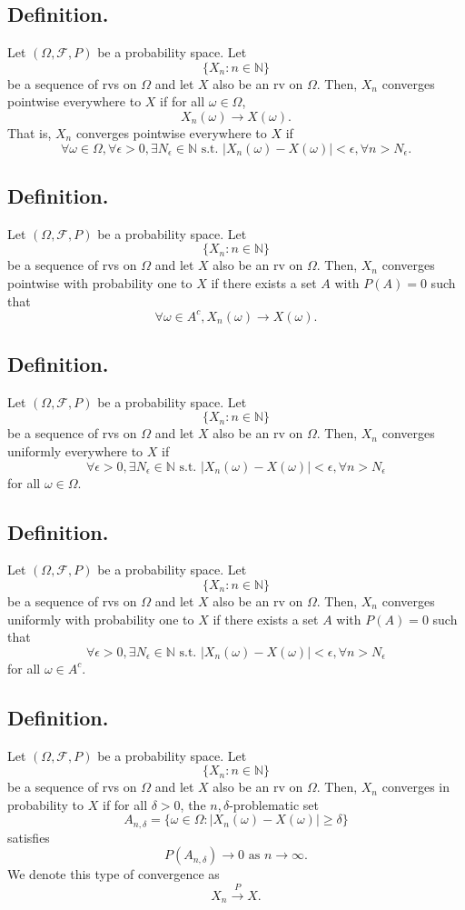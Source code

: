 \documentclass[titlepage]{article}
\begin{document}
\subsection{Definition.} Let $(\Omega, \mathcal{F}, P)$ be a probability space. Let 
$$\{X_{n}: n \in \mathbb{N}\}$$
be a sequence of rvs on $\Omega$ and let $X$ also be an rv on $\Omega$. Then, $X_{n}$ converges pointwise everywhere to $X$ if for all $\omega \in \Omega$,
$$X_{n}(\omega) \to X(\omega).$$
That is, $X_{n}$ converges pointwise everywhere to $X$ if 
$$\forall \omega \in \Omega, \forall \epsilon > 0, \exists N_{\epsilon} \in \mathbb{N} \text{ s.t. } |X_{n}(\omega) - X(\omega)| < \epsilon, \forall n > N_{\epsilon}.$$

\subsection{Definition.} Let $(\Omega, \mathcal{F}, P)$ be a probability space. Let 
$$\{X_{n}: n \in \mathbb{N}\}$$
be a sequence of rvs on $\Omega$ and let $X$ also be an rv on $\Omega$. Then, $X_{n}$ converges pointwise with probability one to $X$ if there exists a set $A$ with $P(A) = 0$ such that 
$$\forall \omega \in A^{c}, X_{n}(\omega) \to X(\omega).$$

\subsection{Definition.} Let $(\Omega, \mathcal{F}, P)$ be a probability space. Let
$$\{X_{n}: n \in \mathbb{N}\}$$
be a sequence of rvs on $\Omega$ and let $X$ also be an rv on $\Omega$. Then, $X_{n}$ converges uniformly everywhere to $X$ if 
$$\forall \epsilon > 0, \exists N_{\epsilon} \in \mathbb{N} \text{ s.t. } |X_{n}(\omega) - X(\omega)| < \epsilon, \forall n > N_{\epsilon}$$
for all $\omega \in \Omega$.

\subsection{Definition.} Let $(\Omega, \mathcal{F}, P)$ be a probability space. Let
$$\{X_{n}: n \in \mathbb{N}\}$$
be a sequence of rvs on $\Omega$ and let $X$ also be an rv on $\Omega$. Then, $X_{n}$ converges uniformly with probability one to $X$ if there exists a set $A$ with $P(A) = 0$ such that
$$\forall \epsilon > 0, \exists N_{\epsilon} \in \mathbb{N} \text{ s.t. } |X_{n}(\omega) - X(\omega)| < \epsilon, \forall n > N_{\epsilon}$$
for all $\omega \in A^{c}$.

\subsection{Definition.} Let $(\Omega, \mathcal{F}, P)$ be a probability space. Let
$$\{X_{n}: n \in \mathbb{N}\}$$
be a sequence of rvs on $\Omega$ and let $X$ also be an rv on $\Omega$. Then, $X_{n}$ converges in probability to $X$ if for all $\delta > 0$, the $n,\delta$-problematic set 
$$A_{n,\delta} = \{\omega \in \Omega: |X_{n}(\omega) - X(\omega)| \geq \delta\}$$
satisfies 
$$P(A_{n,\delta}) \to 0 \text{ as } n \to \infty.$$
We denote this type of convergence as 
$$X_{n} \xrightarrow{P} X.$$
\end{document}
